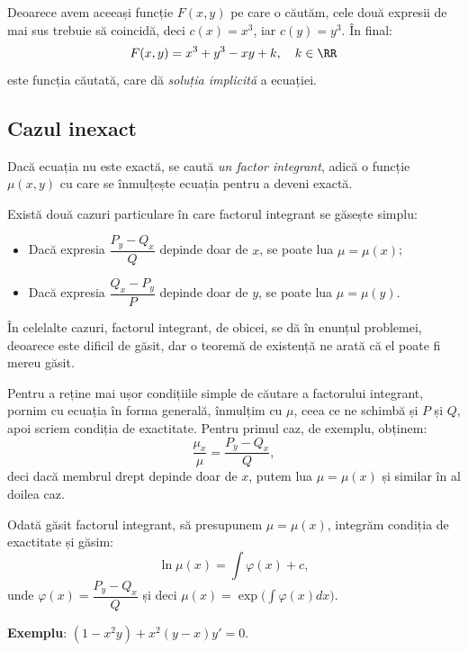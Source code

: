 Deoarece avem aceeași funcție $ F(x, y) $ pe care o căutăm, cele două expresii de mai
sus trebuie să coincidă, deci $ c(x) = x^3 $, iar $ c(y) = y^3 $. În final:
\[
  F(x, y) = x^3 + y^3 - xy + k, \quad k \in \RR
\]
este funcția căutată, care dă \emph{soluția implicită} a ecuației.



\subsection{Cazul inexact}

Dacă ecuația nu este exactă, se caută \emph{un factor integrant}, adică o funcție $\mu(x, y)$
cu care se înmulțește ecuația pentru a deveni exactă.

Există două cazuri particulare în care factorul integrant se găsește simplu:
\begin{itemize}
\item Dacă expresia $\dfrac{P_y - Q_x}{Q}$ depinde doar de $x$, se poate lua $\mu = \mu(x)$;
\item Dacă expresia $\dfrac{Q_x - P_y}{P}$ depinde doar de $y$, se poate lua $\mu = \mu(y)$.
\end{itemize}

În celelalte cazuri, factorul integrant, de obicei, se dă în enunțul problemei, deoarece este
dificil de găsit, dar o teoremă de existență ne arată că el poate fi mereu găsit.

\begin{remark}\label{rk:int}
  Pentru a reține mai ușor condițiile simple de căutare a factorului integrant, pornim cu
  ecuația în forma generală, înmulțim cu $\mu$, ceea ce ne schimbă și $P$ și $Q$, apoi scriem
  condiția de exactitate. Pentru primul caz, de exemplu, obținem:
  \[
    \frac{\mu_x}{\mu} = \frac{P_y - Q_x}{Q},
  \]
  deci dacă membrul drept depinde doar de $x$, putem lua $\mu = \mu(x)$ și similar în al doilea caz.
\end{remark}

Odată găsit factorul integrant, să presupunem $\mu = \mu(x)$, integrăm condiția de exactitate și găsim:
\[
  \ln \mu(x) = \int \varphi(x) + c,
\]
unde $\varphi(x) = \dfrac{P_y - Q_x}{Q}$ și deci $\mu(x) = \exp \Big( \int \varphi(x) dx \Big)$.

\vspace{1cm}

\textbf{Exemplu}: $(1 - x^2 y) + x^2 (y - x) y' = 0$.

